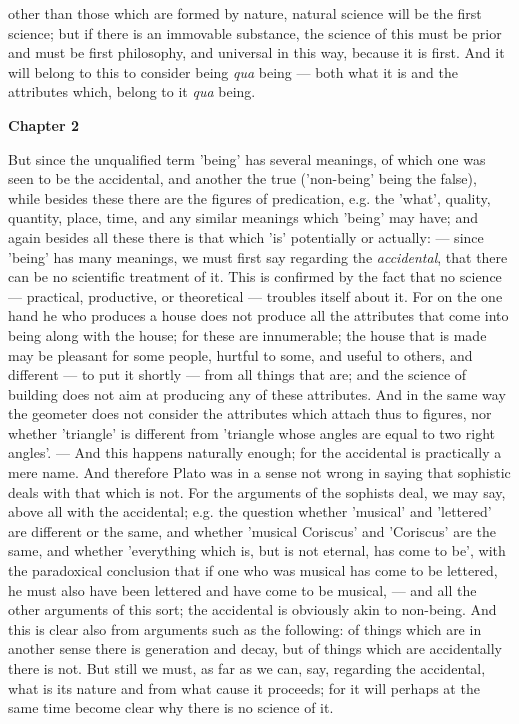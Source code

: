 other than those which are formed by nature, natural science will be the first science; but if there is an immovable substance, the science of this must be prior and must be first philosophy, and universal in this way, because it is first. And it will belong to this to consider being \emph{qua} being — both what it is and the attributes which, belong to it \emph{qua} being.

\textbf{Chapter 2}

But since the unqualified term 'being' has several meanings, of which one was seen to be the accidental, and another the true ('non-being' being the false), while besides these there are the figures of predication, e.g. the 'what', quality, quantity, place, time, and any similar meanings which 'being' may have; and again besides all these there is that which 'is' potentially or actually: — since 'being' has many meanings, we must first say regarding the \emph{accidental}, that there can be no scientific treatment of it. This is confirmed by the fact that no science — practical, productive, or theoretical — troubles itself about it. For on the one hand he who produces a house does not produce all the attributes that come into being along with the house; for these are innumerable; the house that is made may be pleasant for some people, hurtful to some, and useful to others, and different — to put it shortly — from all things that are; and the science of building does not aim at producing any of these attributes. And in the same way the geometer does not consider the attributes which attach thus to figures, nor whether 'triangle' is different from 'triangle whose angles are equal to two right angles'. — And this happens naturally enough; for the accidental is practically a mere name. And therefore Plato was in a sense not wrong in saying that sophistic deals with that which is not. For the arguments of the sophists deal, we may say, above all with the accidental; e.g. the question whether 'musical' and 'lettered' are different or the same, and whether 'musical Coriscus' and 'Coriscus' are the same, and whether 'everything which is, but is not eternal, has come to be', with the paradoxical conclusion that if one who was musical has come to be lettered, he must also have been lettered and have come to be musical, — and all the other arguments of this sort; the accidental is obviously akin to non-being. And this is clear also from arguments such as the following: of things which are in another sense there is generation and decay, but of things which are accidentally there is not. But still we must, as far as we can, say, regarding the accidental, what is its nature and from what cause it proceeds; for it will perhaps at the same time become clear why there is no science of it.

